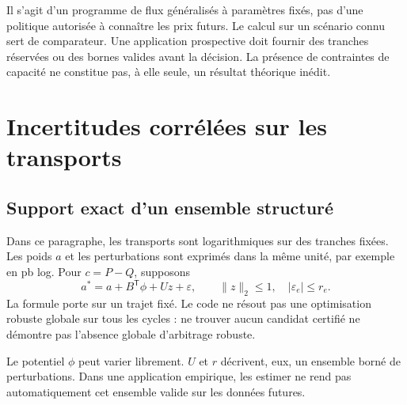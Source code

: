 Il s'agit d'un programme de flux généralisés à paramètres fixés, pas d'une politique autorisée à connaître les prix futurs. Le calcul sur un scénario connu sert de comparateur. Une application prospective doit fournir des tranches réservées ou des bornes valides avant la décision. La présence de contraintes de capacité ne constitue pas, à elle seule, un résultat théorique inédit.

\section{Incertitudes corrélées sur les transports}
\label{sec:ext-support}

\subsection{Support exact d'un ensemble structuré}

Dans ce paragraphe, les transports sont logarithmiques sur des tranches fixées. Les poids \(a\) et les perturbations sont exprimés dans la même unité, par exemple en pb log. Pour \(c=P-Q\), supposons
\begin{equation}
 a^*=a+B^{\mathsf T}\phi+Uz+\varepsilon,
 \qquad \lVert z\rVert_2\le1,\quad |\varepsilon_e|\le r_e.
 \label{eq:ext-factor-set}
\end{equation}
La formule porte sur un trajet fixé. Le code ne résout pas une optimisation robuste globale sur tous les cycles : ne trouver aucun candidat certifié ne démontre pas l'absence globale d'arbitrage robuste.

Le potentiel \(\phi\) peut varier librement. \(U\) et \(r\) décrivent, eux, un ensemble borné de perturbations. Dans une application empirique, les estimer ne rend pas automatiquement cet ensemble valide sur les données futures.

